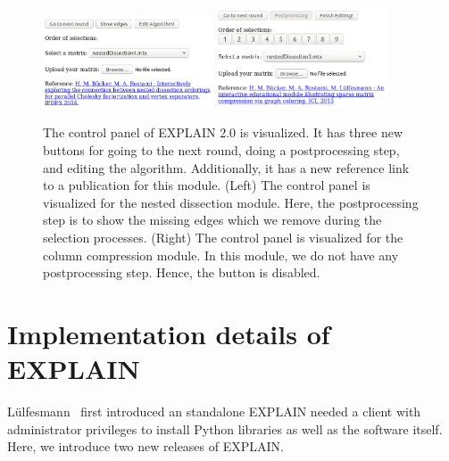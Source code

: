 \documentclass[12pt, twoside,a4paper,toc=bibliography]{scrbook}
\begin{document}
\begin{figure}
\centering
\includegraphics[width=0.45\textwidth]{bottom_new_explain1}
\hfill
\includegraphics[width=0.45\textwidth]{bottom_new_explain}
\caption{The control panel of EXPLAIN 2.0 is visualized.
It has three new buttons for going to the next round,
doing a postprocessing step, and editing the algorithm.
Additionally, it has a new reference link to a publication
for this module.
(Left) The control panel is visualized for the nested dissection module.
Here, the postprocessing step is to show the missing edges which we remove
during the selection processes. 
(Right) The control panel is visualized for the column compression module. 
In this module, we do not have any postprocessing step. Hence, the button is disabled.}
\label{f.bottom_new_explain}
\end{figure}
\section{Implementation details of EXPLAIN}
\label{s.impl.explain}
Lülfesmann~\cite{Lulfesmann2010} first introduced an standalone EXPLAIN needed a client with administrator privileges to install Python libraries as well as the software itself.
Here, we introduce two new releases of EXPLAIN.
\end{document}
